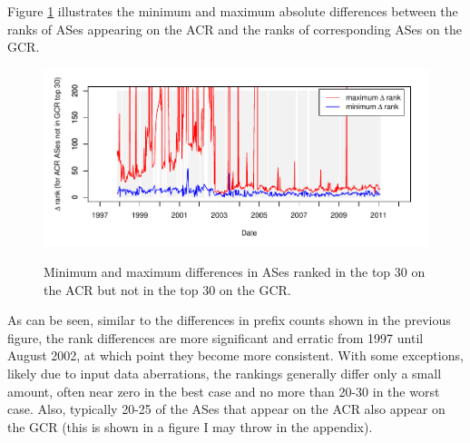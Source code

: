 Figure \ref{fig:comp_rank_error} illustrates the minimum and maximum absolute
differences between the ranks of ASes appearing on the ACR and the ranks of
corresponding ASes on the GCR.

\begin{figure}[h!]
\begin{centering}
\begin{singlespace}
    \includegraphics[width=6in]{figures/cidr_report_validity_rank_error.pdf}
    \vspace{-2em}\\
    \caption{Minimum and maximum differences in ASes ranked in the top 30 on
        the ACR but not in the top 30 on the GCR.}
    \label{fig:comp_rank_error}
\end{singlespace}
\end{centering}
\end{figure}

As can be seen, similar to the differences in prefix counts shown in the
previous figure, the rank differences are more significant and erratic from
1997 until August 2002, at which point they become more consistent. With some
exceptions, likely due to input data aberrations, the rankings generally differ
only a small amount, often near zero in the best case and no more than 20-30
in the worst case. Also, typically 20-25 of the ASes that appear on the ACR
also appear on the GCR (this is shown in a figure I may throw in the appendix).

%

